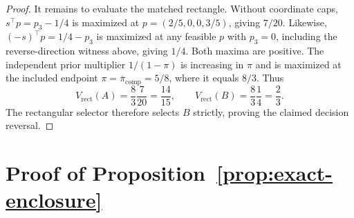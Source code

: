 \documentclass[preprint,review,12pt]{elsarticle}
\begin{document}
\begin{proof}
It remains to evaluate the matched rectangle. Without coordinate caps,
\(s^\top p=p_3-1/4\) is maximized at
\(p=(2/5,0,0,3/5)\), giving \(7/20\). Likewise,
\((-s)^\top p=1/4-p_3\) is maximized at any feasible \(p\) with \(p_3=0\),
including the reverse-direction witness above, giving \(1/4\). Both maxima
are positive. The independent prior multiplier \(1/(1-\pi)\) is increasing in
\(\pi\) and is maximized at the included endpoint
\(\pi=\bar\pi_{\mathrm{comp}}=5/8\), where it equals \(8/3\). Thus
\[
V_{\mathrm{rect}}(A)=\frac83\frac7{20}=\frac{14}{15},\qquad
V_{\mathrm{rect}}(B)=\frac83\frac14=\frac23.
\]
The rectangular selector therefore selects \(B\) strictly, proving the claimed
decision reversal.
\end{proof}

\section{Proof of Proposition~\ref{prop:exact-enclosure}}
\label{app:oracle-proof}
\end{document}
